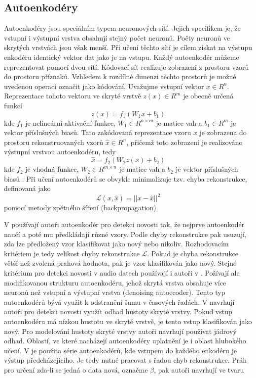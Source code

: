 \subsection{Autoenkodéry}
Autoenkodéry jsou speciálním typem neuronových sítí. Jejich specifikem je, že vstupní i výstupní vrstva obsahují stejný počet neuronů. Počty neuronů ve skrytých vrstvách jsou však menší. Při učení těchto sítí je cílem získat na výstupu enkodéru identický vektor dat jako je na vstupu. Každý autoenkodér můžeme reprezentovat pomocí dvou sítí. Kódovací síť realizuje zobrazení z prostoru vzorů do prostoru příznaků. Vzhledem k rozdílné dimenzi těchto prostorů je možné uvedenou operaci označit jako kódování. Uvažujme vstupní vektor $x \in R^n$. Reprezentace tohoto vektoru ve skryté vrstvě $z(x)\in R^m$ je obecně určená funkcí 
\begin{equation}
z(x)=f_1(W_1 x+b_1) 
\end{equation}
kde $f_1$ je nelineární aktivační funkce, $W_1 \in R^{n\times m}$ je matice vah a $b_1 \in R^m$ je vektor příslušných biasů. Tato zakódovaná reprezentace vzoru $x$ je zobrazena do prostoru rekonstruovaných vzorů $\hat{x}\in R^n$, přičemž toto zobrazení je realizováno výstupní vrstvou autoenkodéru, tedy
\begin{equation}
\hat{x}=f_2(W_2z(x)+b_2)
\end{equation}
kde $f_2$ je vhodná funkce, $W_2\in R^{m \times n}$ je matice vah a $b_2$ je vektor příslušných biasů \cite{auto1}. Při učení autoenkodérů se obvykle minimalizuje tzv. chyba rekonstrukce, definovaná jako
\begin{equation}
\mathcal{L}(x,\hat{x})= \lvert\lvert x - \hat{x}\rvert \rvert^2
\end{equation}
pomocí metody zpětného šíření (backpropagation).
\par 
V \cite{auto2} používají autoři autoenkodér pro detekci novosti tak, že nejprve autoenkodér naučí a poté mu předkládají různé vzory. Podle chyby rekonstrukce pak usuzují, zda lze předložený vzor klasifikovat jako nový nebo nikoliv. Rozhodovacím kritériem je tedy velikost chyby rekonstrukce $\mathcal{L}$. Pokud je chyba rekonstrukce větší než zvolená prahová hodnota, pak je vzor klasifikován jako nový. Stejné kritérium pro detekci novosti v audio datech používají i autoři v \cite{auto3}. Požívají ale modifikovanou strukturu autoenkodéru, jehož skrytá vrstva obsahuje více neuronů než vstupní a výstupní vrstva (denoising autoecoder). Tento typ autoenkodérů bývá využit k odstranění šumu v časových řadách.
V \cite {auto1} navrhují autoři pro detekci novosti využít odhad hustoty skryté vrstvy. Pokud vstup autoenkodéru má nízkou hustotu ve skryté vrstvě, je tento vstup klasifikován jako nový. Pro modelování hustoty skryté vrstvy autoři navrhují používat jádrový odhad. Oblastí, ve které nacházejí autoenkodéry uplatnění je i oblast hlubokého učení. V \cite{auto4} je použita série autoenkodérů, kde vstupem do každého enkodéru je výstup předcházejícího. Je tedy nutné pracovat s řadou chyb rekonstrukce. Práh pro určení zda-li se jedná o data nová, označme $\beta$, pak autoři navrhují ve tvaru

